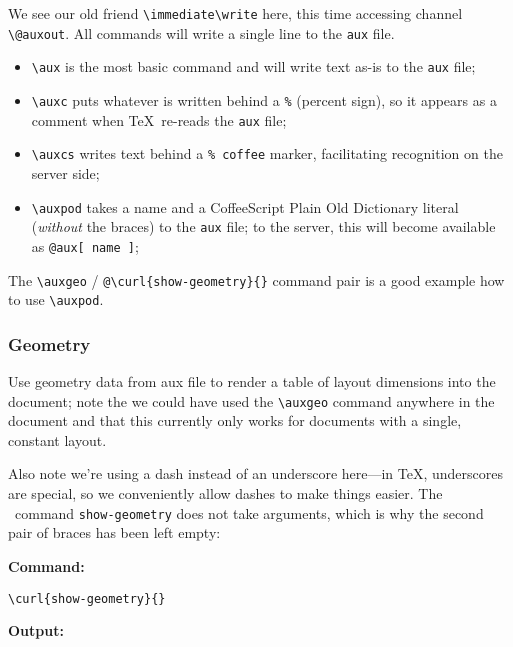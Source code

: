 We see our old friend \verb#\immediate\write# here, this time accessing channel \verb#\@auxout#. All commands
will write a single line to the \verb#aux# file.

\begin{itemize}
\item
  \verb#\aux# is the most basic command and will write text as-is to the \verb#aux# file;
\item
  \verb#\auxc# puts whatever is written behind a \verb#%# (percent sign), so it appears as a comment when
  \TeX\ re-reads the \verb#aux# file;
\item
  \verb#\auxcs# writes text behind a \verb#% coffee# marker, facilitating recognition on the server side;
\item
  \verb#\auxpod# takes a name and a CoffeeScript Plain Old Dictionary literal ({\em without} the braces)
  to the \verb#aux# file; to the server, this will become available as \verb#@aux[ name ]#;
\end{itemize}

The \verb#\auxgeo# / \verb#@\curl{show-geometry}{}# command pair is a good example how to use \verb#\auxpod#.


\subsubsection{Geometry}\label{geo}


\auxgeo

Use geometry data from aux file to render a table of layout dimensions into the document;
note the we could have used the \verb#\auxgeo# command anywhere in the document and that
this currently only works for documents with a single, constant layout.

Also note we're using a dash instead of an underscore here---in \TeX, underscores are special, so
we conveniently allow dashes to make things easier. The \CXLTX\ command \verb#show-geometry# does
not take arguments, which is why the second pair of braces has been left empty:

{\textbf{Command:}}
\begin{verbatim}
\curl{show-geometry}{}
\end{verbatim}

{\textbf{Output:}}

